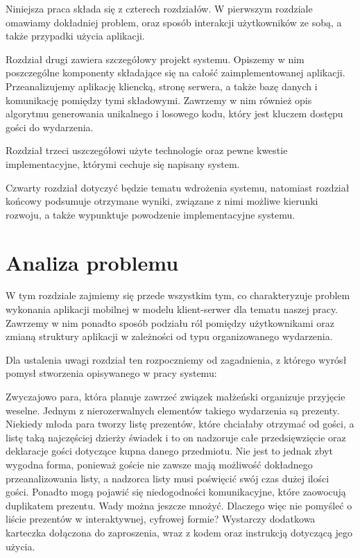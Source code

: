 \documentclass[10pt,titlepage]{article}
\begin{document}
Niniejsza praca składa się z czterech rozdziałów. W pierwszym rozdziale omawiamy dokładniej problem, oraz sposób interakcji użytkowników ze sobą, a także
przypadki użycia aplikacji.

Rozdział drugi zawiera szczegółowy projekt systemu. Opiszemy w nim poszczególne komponenty składające się na całość zaimplementowanej aplikacji. Przeanalizujemy
aplikację kliencką, stronę serwera, a także bazę danych i komunikację pomiędzy tymi składowymi. Zawrzemy w nim również opis algorytmu generowania unikalnego i losowego
kodu, który jest kluczem dostępu gości do wydarzenia.

Rozdział trzeci uszczegółowi użyte technologie oraz pewne kwestie implementacyjne, którymi cechuje się napisany system.

Czwarty rozdział dotyczyć będzie tematu wdrożenia systemu, natomiast rozdział końcowy podsumuje otrzymane wyniki, związane z nimi możliwe kierunki rozwoju,
a także wypunktuje powodzenie implementacyjne systemu.

\newpage
\section{Analiza problemu}
W tym rozdziale zajmiemy się przede wszystkim tym, co charakteryzuje problem wykonania aplikacji mobilnej w modelu klient-serwer dla tematu naszej pracy. Zawrzemy w nim
ponadto sposób podziału ról pomiędzy użytkownikami oraz zmianą struktury aplikacji w zależności od typu organizowanego wydarzenia.

Dla ustalenia uwagi rozdział ten rozpoczniemy od zagadnienia, z którego wyrósł pomysł stworzenia opisywanego w pracy systemu:

\begin{beamerlikethm}{}
Zwyczajowo para, która planuje zawrzeć związek małżeński organizuje przyjęcie weselne. Jednym z nierozerwalnych elementów takiego wydarzenia są prezenty.
Niekiedy młoda para tworzy listę prezentów, które chciałaby otrzymać od gości, a listę taką najczęściej dzierży świadek i to on nadzoruje całe przedsięwzięcie
oraz deklaracje gości dotyczące kupna danego przedmiotu. Nie jest to jednak zbyt wygodna forma, ponieważ goście nie zawsze mają możliwość dokładnego przeanalizowania
listy, a nadzorca listy musi poświęcić swój czas dużej ilości gości. Ponadto mogą pojawić się niedogodności komunikacyjne, które zaowocują duplikatem prezentu. Wady można
jeszcze mnożyć. Dlaczego więc nie pomyśleć o liście prezentów w interaktywnej, cyfrowej formie? Wystarczy dodatkowa karteczka dołączona do zaproszenia, wraz z kodem
oraz instrukcją dotyczącą jego użycia.
\end{beamerlikethm}
\end{document}
